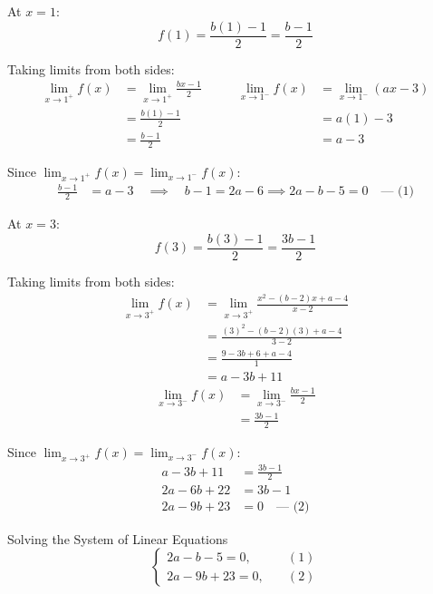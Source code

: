 \begin{enumerate}
    At $x = 1$:
    \[
        f(1) = \frac{b(1) - 1}{2} = \frac{b - 1}{2}
    \]

    Taking limits from both sides:
    \begin{align*}
        \lim_{x \to 1^+} f(x)  &= \lim_{x \to 1^+} \frac{bx - 1}{2} 
        \qquad & \lim_{x \to 1^-} f(x) &= \lim_{x \to 1^-} (ax - 3) \\
        &= \frac{b(1) - 1}{2} 
        &&= a(1) - 3 \\
        &= \frac{b - 1}{2} 
        &&= a - 3
    \end{align*}

    Since $\lim_{x \to 1^+} f(x) = \lim_{x \to 1^-} f(x)$:
    \begin{align*}
        \frac{b - 1}{2} &= a - 3 \quad \implies \quad b - 1 = 2a - 6 \implies 2a - b - 5 = 0 \quad \text{--- (1)}
    \end{align*}

    At $x = 3$:
    \[
        f(3) = \frac{b(3) - 1}{2} = \frac{3b - 1}{2}
    \]

    Taking limits from both sides:
    \begin{align*}
        \lim_{x \to 3^+} f(x) &= \lim_{x \to 3^+} \frac{x^2 - (b-2)x + a - 4}{x - 2} \\
        &= \frac{(3)^2 - (b-2)(3) + a - 4}{3 - 2} \\
        &= \frac{9 - 3b + 6 + a - 4}{1} \\
        &= a - 3b + 11
    \end{align*}
    \begin{align*}
        \lim_{x \to 3^-} f(x) &= \lim_{x \to 3^-} \frac{bx - 1}{2} \\
        &= \frac{3b - 1}{2}
    \end{align*}

    Since $\lim_{x \to 3^+} f(x) = \lim_{x \to 3^-} f(x)$:
    \begin{align*}
        a - 3b + 11 &= \frac{3b - 1}{2} \\
        2a - 6b + 22 &= 3b - 1 \\
        2a - 9b + 23 &= 0 \quad \text{--- (2)}
    \end{align*}

    \vspace{0.5em}
    Solving the System of Linear Equations
    \[
        \begin{cases}
        2a - b - 5 = 0, & \quad (1) \\
        2a - 9b + 23 = 0, & \quad (2)
        \end{cases}
    \]



\end{enumerate}

